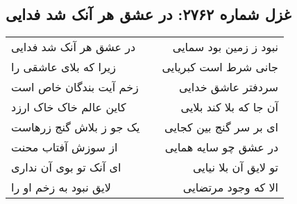 \begin{center}
\section*{غزل شماره ۲۷۶۲: در عشق هر آنک شد فدایی}
\label{sec:2762}
\begin{longtable}{l p{0.5cm} r}
در عشق هر آنک شد فدایی
&&
نبود ز زمین بود سمایی
\\
زیرا که بلای عاشقی را
&&
جانی شرط است کبریایی
\\
زخم آیت بندگان خاص است
&&
سردفتر عاشق خدایی
\\
کاین عالم خاک خاک ارزد
&&
آن جا که بلا کند بلایی
\\
یک جو ز بلاش گنج زرهاست
&&
ای بر سر گنج بین کجایی
\\
از سوزش آفتاب محنت
&&
در عشق چو سایه همایی
\\
ای آنک تو بوی آن نداری
&&
تو لایق آن بلا نیایی
\\
لایق نبود به زخم او را
&&
الا که وجود مرتضایی
\\
\end{longtable}
\end{center}
